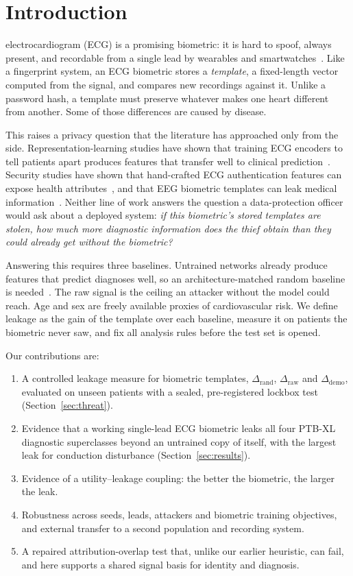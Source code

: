 \documentclass[journal]{IEEEtran}
\newcommand{\drand}{\Delta_{\mathrm{rand}}}
\newcommand{\dsig}{\Delta_{\mathrm{raw}}}
\newcommand{\ddemo}{\Delta_{\mathrm{demo}}}
\begin{document}
\section{Introduction}
 electrocardiogram (ECG) is a promising biometric: it is hard to spoof, always present, and recordable from a single lead by wearables and smartwatches~\cite{odinaka2012ecg}. Like a fingerprint system, an ECG biometric stores a \emph{template}, a fixed-length vector computed from the signal, and compares new recordings against it. Unlike a password hash, a template must preserve whatever makes one heart different from another. Some of those differences are caused by disease.

This raises a privacy question that the literature has approached only from the side. Representation-learning studies have shown that training ECG encoders to tell patients apart produces features that transfer well to clinical prediction~\cite{diamant2022pclr,sangha2024bcl,thiebaud2026biomecg}. Security studies have shown that hand-crafted ECG authentication features can expose health attributes~\cite{noh2022broken}, and that EEG biometric templates can leak medical information~\cite{holler2018eeg}. Neither line of work answers the question a data-protection officer would ask about a deployed system: \emph{if this biometric's stored templates are stolen, how much more diagnostic information does the thief obtain than they could already get without the biometric?}

Answering this requires three baselines. Untrained networks already produce features that predict diagnoses well, so an architecture-matched random baseline is needed~\cite{berger2026position}. The raw signal is the ceiling an attacker without the model could reach. Age and sex are freely available proxies of cardiovascular risk. We define leakage as the gain of the template over each baseline, measure it on patients the biometric never saw, and fix all analysis rules before the test set is opened.

Our contributions are:
\begin{enumerate}
\item A controlled leakage measure for biometric templates, $\drand$, $\dsig$ and $\ddemo$, evaluated on unseen patients with a sealed, pre-registered lockbox test (Section~\ref{sec:threat}).
\item Evidence that a working single-lead ECG biometric leaks all four PTB-XL diagnostic superclasses beyond an untrained copy of itself, with the largest leak for conduction disturbance (Section~\ref{sec:results}).
\item Evidence of a utility--leakage coupling: the better the biometric, the larger the leak.
\item Robustness across seeds, leads, attackers and biometric training objectives, and external transfer to a second population and recording system.
\item A repaired attribution-overlap test that, unlike our earlier heuristic, can fail, and here supports a shared signal basis for identity and diagnosis.
\end{enumerate}
\end{document}
